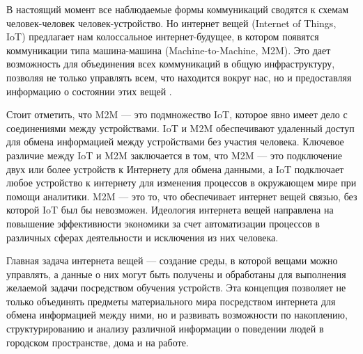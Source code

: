 \Introduction


В настоящий момент все наблюдаемые формы коммуникаций сводятся к схемам человек-человек  человек-устройство. Но интернет вещей (Internet of Things, IoT) предлагает нам колоссальное интернет-будущее, в котором появятся коммуникации типа машина-машина (Machine-to-Machine, M2M). Это дает возможность для объединения всех коммуникаций в общую инфраструктуру, позволяя не только управлять всем, что находится вокруг нас, но и предоставляя информацию о состоянии этих вещей \cite{Dovgal}.

Стоит отметить, что M2M --- это подмножество IoT, которое явно имеет дело с соединениями между устройствами. IoT и M2M обеспечивают удаленный доступ для обмена информацией между устройствами без участия человека. Ключевое различие между IoT и M2M заключается в том, что M2M — это подключение двух или более устройств к Интернету для обмена данными, а IoT подключает любое устройство к интернету для изменения процессов в окружающем мире при помощи аналитики. M2M --- это то, что обеспечивает интернет вещей связью, без которой IoT был бы невозможен. Идеология интернета вещей направлена на повышение эффективности экономики за счет автоматизации процессов в различных сферах деятельности и исключения из них человека.







Главная задача интернета вещей \cite{Markeeva} --- создание среды, в которой вещами можно управлять, а данные о них могут быть получены и обработаны для выполнения желаемой задачи посредством обучения устройств. Эта концепция позволяет не только объединять предметы материального мира посредством интернета для обмена информацией между ними, но и развивать возможности по накоплению, структурированию и анализу различной информации о поведении людей в городском пространстве, дома и на работе.

